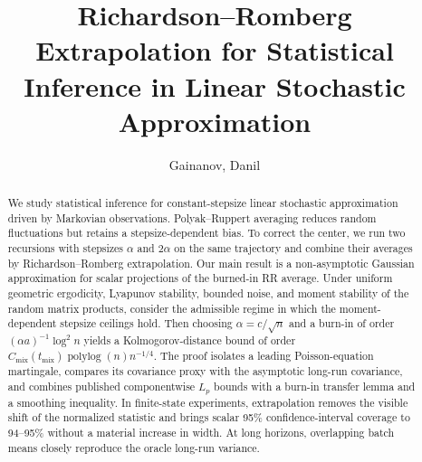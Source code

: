 \English
\title[RR extrapolation in linear stochastic approximation]
{Richardson--Romberg Extrapolation for Statistical Inference
in Linear Stochastic Approximation}

\author{Gainanov, Danil}
\address{\href{https://www.hse.ru/en/}{HSE University}, Moscow, Russia}

\begin{abstract}
We study statistical inference for constant-stepsize linear stochastic
approximation driven by Markovian observations. Polyak--Ruppert averaging
reduces random fluctuations but retains a stepsize-dependent bias. To correct
the center, we run two recursions with stepsizes $\alpha$ and $2\alpha$ on the
same trajectory and combine their averages by Richardson--Romberg
extrapolation. Our main result is a non-asymptotic Gaussian approximation for
scalar projections of the burned-in RR average. Under uniform geometric
ergodicity, Lyapunov stability, bounded noise, and moment stability of the
random matrix products, consider the admissible regime in which the
moment-dependent stepsize ceilings hold. Then choosing $\alpha=c/\sqrt n$ and
a burn-in of order $(\alpha a)^{-1}\log^2n$ yields a Kolmogorov-distance
bound of order $C_{\mathrm{mix}}(t_{\mathrm{mix}})
\operatorname{polylog}(n)n^{-1/4}$. The proof isolates a leading
Poisson-equation martingale, compares its covariance proxy with the
asymptotic long-run covariance, and combines published componentwise $L_p$
bounds with a burn-in transfer lemma and a smoothing inequality. In finite-state
experiments, extrapolation removes the visible shift of the normalized
statistic and brings scalar 95\% confidence-interval coverage to 94--95\%
without a material increase in width. At long horizons, overlapping batch
means closely reproduce the oracle long-run variance.
\end{abstract}

\Russian
